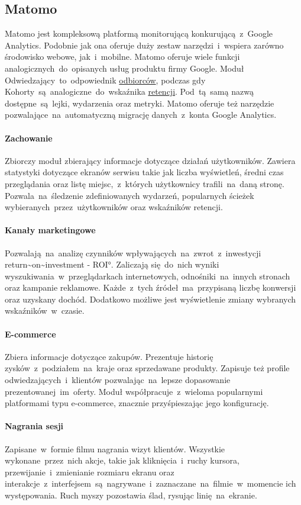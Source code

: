 \subsection{Matomo}
\label{sec:matomo}
Matomo jest kompleksową platformą monitorującą konkurującą~z~Google Analytics. Podobnie jak ona oferuje duży zestaw narzędzi~i~wspiera zarówno środowisko webowe, jak~i~mobilne. Matomo oferuje wiele funkcji analogicznych~do~opisanych usług produktu firmy Google. Moduł Odwiedzający~to~odpowiednik \hyperref[par:ga-audiences]{odbiorców}, podczas gdy Kohorty~są~analogiczne~do~wskaźnika \hyperref[par:ga-retention]{retencji}. Pod~tą~samą nazwą dostępne~są~lejki, wydarzenia oraz metryki. Matomo oferuje też narzędzie pozwalające~na~automatyczną migrację danych~z~konta Google Analytics.

\paragraph{Zachowanie}
Zbiorczy moduł zbierający informacje dotyczące działań użytkowników. Zawiera statystyki dotyczące ekranów serwisu takie jak liczba wyświetleń, średni czas przeglądania oraz listę miejsc,~z~których użytkownicy trafili~na~daną stronę. Pozwala~na~śledzenie zdefiniowanych wydarzeń, popularnych ścieżek wybieranych~przez~użytkowników oraz wskaźników retencji.

\paragraph{Kanały marketingowe}
Pozwalają~na~analizę czynników wpływających~na~zwrot~z~inwestycji \ang{return~on~investment - ROI}. Zaliczają się~do~nich wyniki wyszukiwania~w~przeglądarkach internetowych, odnośniki~na~innych stronach oraz kampanie reklamowe. Każde~z~tych źródeł~ma~przypisaną liczbę konwersji oraz uzyskany dochód. Dodatkowo możliwe jest wyświetlenie zmiany wybranych wskaźników~w~czasie.

\paragraph{E-commerce}
Zbiera informacje dotyczące zakupów. Prezentuje historię zysków~z~podziałem~na~kraje oraz sprzedawane produkty. Zapisuje też profile odwiedzających~i~klientów pozwalając~na~lepsze dopasowanie prezentowanej~im~oferty. Moduł współpracuje~z~wieloma popularnymi platformami typu e-commerce, znacznie przyśpieszając jego konfigurację.

\paragraph{Nagrania sesji}
Zapisane~w~formie filmu nagrania wizyt klientów. Wszystkie wykonane~przez~nich akcje, takie jak kliknięcia~i~ruchy kursora, przewijanie~i~zmienianie rozmiaru ekranu oraz interakcje~z~interfejsem~są~nagrywane~i~zaznaczane~na~filmie~w~momencie ich występowania. Ruch myszy pozostawia ślad, rysując linię~na~ekranie.

